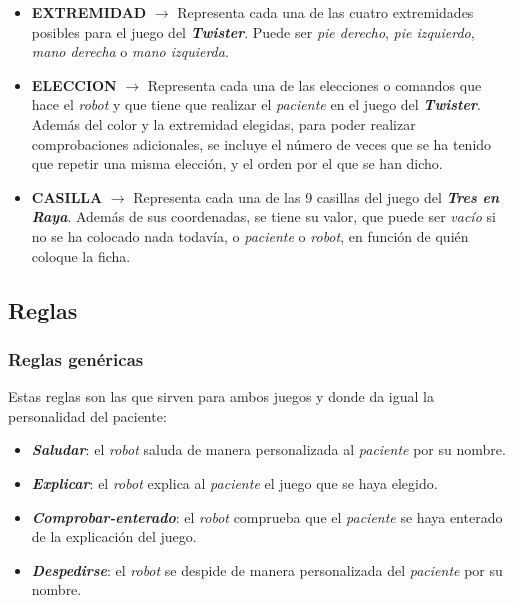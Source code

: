 \documentclass{uc3mpracticas}
\begin{document}
\begin{itemize}
    \item \textbf{EXTREMIDAD} $\rightarrow$ Representa cada una de las cuatro extremidades posibles para el juego del \textbf{\textit{Twister}}. Puede ser \textit{pie derecho}, \textit{pie izquierdo}, \textit{mano derecha} o \textit{mano izquierda}.

    \item \textbf{ELECCION} $\rightarrow$ Representa cada una de las elecciones o comandos que hace el \textit{robot} y que tiene que realizar el \textit{paciente} en el juego del \textbf{\textit{Twister}}. Además del color y la extremidad elegidas, para poder realizar comprobaciones adicionales, se incluye el número de veces que se ha tenido que repetir una misma elección, y el orden por el que se han dicho.

    \item \textbf{CASILLA} $\rightarrow$ Representa cada una de las 9 casillas del juego del \textit{\textbf{Tres en Raya}}. Además de sus coordenadas, se tiene su valor, que puede ser \textit{vacío} si no se ha colocado nada todavía, o \textit{paciente} o \textit{robot}, en función de quién coloque la ficha.
  \end{itemize}



  \subsection{Reglas}

  \subsubsection{Reglas genéricas}

  Estas reglas son las que sirven para ambos juegos y donde da igual la personalidad del paciente:

  \begin{itemize}
    \item \textbf{\textit{Saludar}}: el \textit{robot} saluda de manera personalizada al \textit{paciente} por su nombre.
    \item \textbf{\textit{Explicar}}: el \textit{robot} explica al \textit{paciente} el juego que se haya elegido.
    \item \textbf{\textit{Comprobar-enterado}}: el \textit{robot} comprueba que el \textit{paciente} se haya enterado de la explicación del juego.
    \item \textbf{\textit{Despedirse}}: el \textit{robot} se despide de manera personalizada del \textit{paciente} por su nombre.
  \end{itemize}
\end{document}
